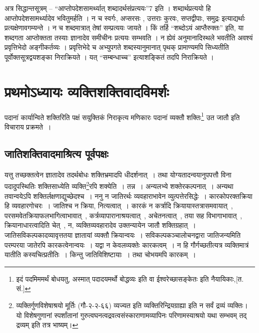 	अत्र सिद्धान्तसूत्रम् – “आप्तोपदेशसामर्थ्यात् शब्दादर्थसंप्रत्ययः”7 इति । शब्दार्थप्रत्ययो हि आप्तोपदेशसामर्थ्यादेव भवितुमर्हति । न च स्वर्गः, अप्सरसः , उत्तराः कुरवः, सप्तद्वीपाः, समुद्रः इत्याद्यर्थाः प्रत्यक्षेणावगम्यन्ते । न च शब्दमात्रात् तेषां सम्प्रत्ययः जायते । किं तर्हि “शब्दोऽयं आप्तैरुक्तः” इति, या शब्दगता आप्तोक्तता तस्याः ज्ञानादेव समीचीनः प्रत्ययः सम्भवति । न ह्येवं अनुमानादिस्थले भवतीति अवश्यं प्रवृत्तिभेदो अङ्गीकर्तव्यः । प्रवृत्तिभेदे च अभ्युपगते शब्दस्यानुमानात् पृथक् प्रामाण्यमपि सिध्यतीति पूर्वोक्तसूत्रद्वयशङ्का निराक्रियते । यत् “सम्बन्धाच्च” इत्याशङ्कितं तदपि निराक्रियते ।

\chapter{प्रथमोऽध्यायः  व्यक्तिशक्तिवादविमर्शः}

	पदानां कार्यान्विते शक्तिरिति पक्षं सयुक्तिकं निराकृत्य मणिकारः पदानां व्यक्तौ शक्तिः\footnote{इदं पदमिममर्थं बोधयतु, अस्मात् पदादयमर्थो बोद्धव्यः इति वा ईश्वरेच्छासङ्केतः इति नैयायिकाः,[त. सं.]} उत जातौ इति विचाराय प्रक्रमते~।

	\section{जातिशक्तिवादमाश्रित्य पूर्वपक्षः}

	\begin{small}
		यत्तु तच्छक्तत्वेन ज्ञातादेव तदर्थबोधः शक्तिभ्रमादपि धीदर्शनात्~। तथा योग्यतादन्वयानुपपत्तौ विना पदादुपस्थितिः शक्तिसाध्येति व्यक्ति\footnote{व्यक्तिर्गुणविशेषाश्रयो मूर्तिः (गौ-२-२-६६) व्यज्यत इति व्यक्तिरिन्द्रियग्राह्या इति न सर्वं द्रव्यं व्यक्तिः। यो विशेषगुणानां स्पर्शांतानां गुरुत्वघनत्वद्रवत्वसंस्काराणामव्यापिनः परिणामस्याश्रयो यथा सम्भवम् तद् द्रव्यम् इति तत्र भाष्यम्।}रपि शक्येति~। तन्न~। अन्यलभ्ये शक्तेरकल्पनात्~। अन्यथा तवान्वयेऽपि शक्तिर्लक्षणाद्युच्छेदश्च~। ननु न जातिरर्थः व्यवहाराभावेन व्युत्पत्तेरसिद्धेः~। कारकोपरक्तक्रिया हि व्यवहारगोचरः~। जातिश्च न क्रिया, नित्यत्वात्~। कारकं न कर्त्रादि क्रियायास्तत्रासमवायात्~, परसमवेतक्रियाफलभागित्वाभावात्~, कर्त्रव्यापारानाश्रयत्वात्~, अचेतनत्वात्~, तया सह विभागाभावात्~, क्रियानाधारत्वादिति चेत्~, न, व्यक्तिव्यवहारादेव उक्तन्यायेन जातौ शक्तिग्रहात्~। जातिसविकल्पकादव्यावृत्ततया ज्ञातायां व्यक्तौ क्रियान्वयः~। सविकल्पकञ्चालोचनद्वारा जातिजन्यमिति परम्परया जातेरपि कारकत्वेनान्वयः~। यद्वा न केवलव्यक्तेः कारकत्वम्~। न हि गौर्गच्छतीत्यत्र व्यक्तिमात्रं यातीति कस्यचित्प्रतीतिः~। किन्तु जातिविशिष्टायाः~। तथा चोभयमपि कारकम्~।
	\end{small}

